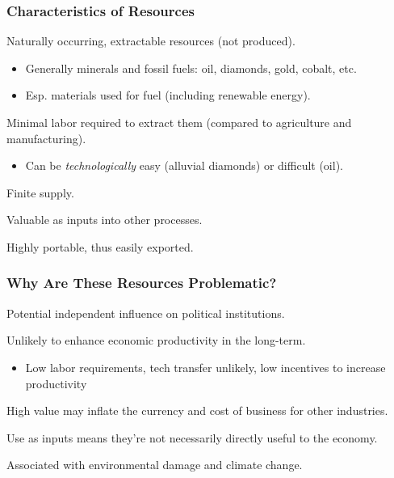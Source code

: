 \documentclass[handout]{beamer}
\begin{document}
\begin{frame} 
	\frametitle{\LARGE{Characteristics of Resources}}
	\begin{itemize}
		\large{  
			\item Naturally occurring, extractable resources (not produced). \pause 
			\begin{itemize}
				\item Generally minerals and fossil fuels: oil, diamonds, gold, cobalt, etc. \pause 
				\item Esp. materials used for fuel (including renewable energy). \pause 
			\end{itemize}
			\item Minimal labor required to extract them (compared to agriculture and manufacturing). \pause 
			\begin{itemize}
				\item Can be \textit{technologically} easy (alluvial diamonds) or difficult (oil). \pause 
			\end{itemize}
			
			\item Finite supply. \pause 
			
			\item Valuable as inputs into other processes. \pause 
			
			\item Highly portable, thus easily exported.
		}
	\end{itemize}
\end{frame}

\begin{frame} 
	\frametitle{\LARGE{Why Are These Resources Problematic?}}
	\begin{itemize}
		\large{
			\item Potential independent influence on political institutions. \pause
			
			\item Unlikely to enhance economic productivity in the long-term. \pause
			\begin{itemize}
				\item Low labor requirements, tech transfer unlikely, low incentives to increase productivity \pause
			\end{itemize}
			
			\item High value may inflate the currency and cost of business for other industries.  \pause
			
			\item Use as inputs means they're not necessarily directly useful to the economy. \pause
			
			\item Associated with environmental damage and climate change.
		}
	\end{itemize}
\end{frame}
\end{document}
